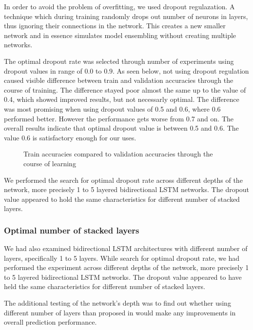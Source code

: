 In order to avoid the problem of overfitting, we used dropout regulazation. 
A technique which during training randomly drops out number of neurons in layers, thus ignoring their connections in the network. This creates a new smaller network and in essence simulates model ensembling without creating multiple networks.

The optimal dropout rate was selected through number of experiments using dropout values in range of $0.0$ to $0.9$. As seen below, not using dropout regulation caused visible difference between train and validation accuracies through the course of training. The difference stayed poor almost the same up to the value of 0.4, which showed improved results, but not necessarly optimal. The difference was most promising when using dropout values of 0.5 and 0.6, where 0.6 performed better. However the performance gets worse from 0.7 and on. The overall results indicate that optimal dropout value is between 0.5 and 0.6. The value 0.6 is satisfactory enough for our uses.

\begin{figure}[h]
	\centering
    \qquad
    \caption{Train accuracies compared to validation accuracies through the course of learning}
\end{figure}

We performed the search for optimal dropout rate across different depths of the network, more precisely 1 to 5 layered bidirectional LSTM networks. The dropout value appeared to hold the same characteristics for different number of stacked layers.

\subsubsection{Optimal number of stacked layers}

We had also examined bidirectional LSTM architectures with different number of layers, specifically 1 to 5 layers. While search for optimal dropout rate, we had performed the experiment across different depths of the network, more precisely 1 to 5 layered bidirectional LSTM networks. The dropout value appeared to have held the same characteristics for different number of stacked layers.

The additional testing of the network's depth was to find out whether using different number of layers than proposed in \cite{bidirect_dynam} would make any improvements in overall prediction performance.

